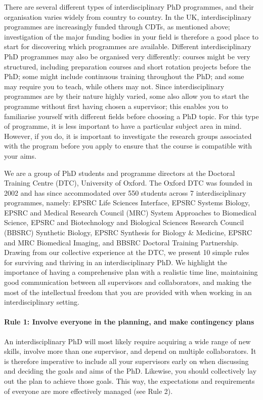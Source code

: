 \documentclass[12pt]{report}
\begin{document}
There are several different types of interdisciplinary PhD programmes, and their organisation varies widely from country to country. In the UK, interdisciplinary programmes are increasingly funded through CDTs, as mentioned above; investigation of the major funding bodies in your field is therefore a good place to start for discovering which programmes are available. Different interdisciplinary PhD programmes may also be organised very differently: courses might be very structured, including preparation courses and short rotation projects before the PhD; some might include continuous training throughout the PhD; and some may require you to teach, while others may not. Since interdisciplinary programmes are by their nature highly varied, some also allow you to start the programme without first having chosen a supervisor; this enables you to familiarise yourself with different fields before choosing a PhD topic. For this type of programme, it is less important to have a particular subject area in mind. However, if you do, it is important to investigate the research groups associated with the program before you apply to ensure that the course is compatible with your aims.

We are a group of PhD students and programme directors at the Doctoral Training Centre (DTC), University of Oxford. The Oxford DTC was founded in 2002 and has since accommodated over 550 students across 7 interdisciplinary programmes, namely: EPSRC Life Sciences Interface, EPSRC Systems Biology, EPSRC and Medical Research Council (MRC) System Approaches to Biomedical Science, EPSRC and Biotechnology and Biological Sciences Research Council (BBSRC) Synthetic Biology, EPSRC Synthesis for Biology \& Medicine, EPSRC and MRC Biomedical Imaging, and BBSRC Doctoral Training Partnership. Drawing from our collective experience at the DTC, we present 10 simple rules for surviving and thriving in an interdisciplinary PhD. We highlight the importance of having a comprehensive plan with a realistic time line, maintaining good communication between all supervisors and collaborators, and making the most of the intellectual freedom that you are provided with when working in an interdisciplinary setting.

\paragraph{Rule 1: Involve everyone in the planning, and make contingency plans}

An interdisciplinary PhD will most likely require acquiring a wide range of new skills, involve more than one supervisor, and depend on multiple collaborators. It is therefore imperative to include all your supervisors early on when discussing and deciding the goals and aims of the PhD. Likewise, you should collectively lay out the plan to achieve those goals. This way, the expectations and requirements of everyone are more effectively managed (see Rule 2).
\end{document}
